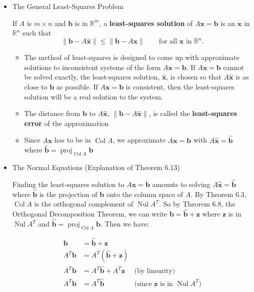 \documentclass[10pt]{book}
\newenvironment{boxdef}{\begin{mdframed}[backgroundcolor=gray!30,linewidth=0pt,nobreak=true]}{\end{mdframed}}
\newcommand{\R}{\mathbb{R}}
\newcommand{\vect}[1]{\ensuremath{\boldsymbol{\mathbf{#1}}}}
\DeclareMathOperator{\Nul}{Nul}
\DeclareMathOperator{\Col}{Col}
\DeclareMathOperator{\proj}{proj}
\newcommand{\Axb}{A\vect{x}=\vect{b}}
\newcommand{\xhat}{\hat{\vect{x}}}
\newcommand{\bhat}{\hat{\vect{b}}}
\newcommand{\Axbhat}{A\xhat=\bhat}
\begin{document}
\begin{itemize}
	\item The General Least-Squares Problem
	\begin{boxdef}
		If $A$ is $m\times n$ and $\vect{b}$ is in $\R^m$, a \textbf{least-squares solution} of $\Axb$ is an $\xhat$ in $\R^n$ such that
		\vspace{-1ex}
		$$ \|\vect{b}-A\xhat\| \leq \|\vect{b}-A\vect{x}\| \qquad
		\text{for all $\vect{x}$ in $\R^n$.} $$
	\end{boxdef}
		\begin{itemize}
			\item The method of least-squares is designed to come up with approximate solutions to inconsistent systems of the form $\Axb$. If $\Axb$ cannot be solved exactly, the least-squares solution, $\xhat$, is chosen so that $A\xhat$ is as close to $\vect{b}$ as possible. If $\Axb$ is consistent, then the least-squares solution will be a real solution to the system.
			\item The distance from $\vect{b}$ to $A\xhat$, $\|\vect{b}-A\xhat\|$, is called the \textbf{least-squares error} of the approximation
			\item Since $A\vect{x}$ has to be in $\Col A$, we approximate $\Axb$ with  $\Axbhat$ where $\bhat=\proj_{\Col A}\vect{b}$
		\end{itemize}
	\item The Normal Equations (Explanation of Theorem 6.13)
		\begin{boxdef}
			Finding the least-squares solution to $\Axb$ amounts to solving $\Axbhat$ where $\bhat$ is the projection of $\vect{b}$ onto the column space of $A$. By Theorem 6.3, $\Col A$ is the orthogonal complement of $\Nul A^T$. So by Theorem 6.8, the Orthogonal Decomposition Theorem, we can write $\vect{b}=\bhat+\vect{z}$ where $\vect{z}$ is in $\Nul A^T$ and $\bhat=\proj_{\Col A}\vect{b}$. Then we have:
			\vspace{-2em}
			\begin{multicols}{2}
				\begin{align*}
				\vect{b} &= \bhat+\vect{z} \\
				A^T\vect{b} &= A^T(\bhat+\vect{z}) \\
				A^T\vect{b} &= A^T\bhat+A^T\vect{z}	& \text{(by linearity)} \\
				A^T\vect{b} &= A^T\bhat	& \text{(since $\vect{z}$ is in $\Nul A^T$)}
				\end{align*}
				\columnbreak
				

\end{multicols}
\end{boxdef}
\end{itemize}
\end{document}
